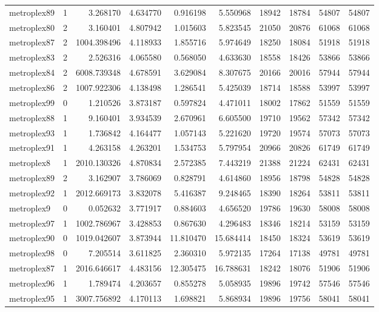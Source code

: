 \begin{longtable}{|l|r|r|r|r|r|r|r|r|r|}
metroplex89 & 1 & 3.268170 & 4.634770 & 0.916198 & 5.550968 & 18942 & 18784 & 54807 & 54807 \\
metroplex80 & 2 & 3.160401 & 4.807942 & 1.015603 & 5.823545 & 21050 & 20876 & 61068 & 61068 \\
metroplex87 & 2 & 1004.398496 & 4.118933 & 1.855716 & 5.974649 & 18250 & 18084 & 51918 & 51918 \\
metroplex83 & 2 & 2.526316 & 4.065580 & 0.568050 & 4.633630 & 18558 & 18426 & 53866 & 53866 \\
metroplex84 & 2 & 6008.739348 & 4.678591 & 3.629084 & 8.307675 & 20166 & 20016 & 57944 & 57944 \\
metroplex86 & 2 & 1007.922306 & 4.138498 & 1.286541 & 5.425039 & 18714 & 18588 & 53997 & 53997 \\
metroplex99 & 0 & 1.210526 & 3.873187 & 0.597824 & 4.471011 & 18002 & 17862 & 51559 & 51559 \\
metroplex88 & 1 & 9.160401 & 3.934539 & 2.670961 & 6.605500 & 19710 & 19562 & 57342 & 57342 \\
metroplex93 & 1 & 1.736842 & 4.164477 & 1.057143 & 5.221620 & 19720 & 19574 & 57073 & 57073 \\
metroplex91 & 1 & 4.263158 & 4.263201 & 1.534753 & 5.797954 & 20966 & 20826 & 61749 & 61749 \\
metroplex8 & 1 & 2010.130326 & 4.870834 & 2.572385 & 7.443219 & 21388 & 21224 & 62431 & 62431 \\
metroplex89 & 2 & 3.162907 & 3.786069 & 0.828791 & 4.614860 & 18956 & 18798 & 54828 & 54828 \\
metroplex92 & 1 & 2012.669173 & 3.832078 & 5.416387 & 9.248465 & 18390 & 18264 & 53811 & 53811 \\
metroplex9 & 0 & 0.052632 & 3.771917 & 0.884603 & 4.656520 & 19786 & 19630 & 58008 & 58008 \\
metroplex97 & 1 & 1002.786967 & 3.428853 & 0.867630 & 4.296483 & 18346 & 18214 & 53159 & 53159 \\
metroplex90 & 0 & 1019.042607 & 3.873944 & 11.810470 & 15.684414 & 18450 & 18324 & 53619 & 53619 \\
metroplex98 & 0 & 7.205514 & 3.611825 & 2.360310 & 5.972135 & 17264 & 17138 & 49781 & 49781 \\
metroplex87 & 1 & 2016.646617 & 4.483156 & 12.305475 & 16.788631 & 18242 & 18076 & 51906 & 51906 \\
metroplex96 & 1 & 1.789474 & 4.203657 & 0.855278 & 5.058935 & 19896 & 19742 & 57546 & 57546 \\
metroplex95 & 1 & 3007.756892 & 4.170113 & 1.698821 & 5.868934 & 19896 & 19756 & 58041 & 58041 \\

\end{longtable}
